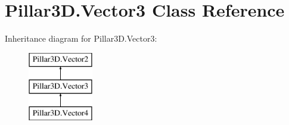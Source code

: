 \hypertarget{class_pillar3_d_1_1_vector3}{}\section{Pillar3\+D.\+Vector3 Class Reference}
\label{class_pillar3_d_1_1_vector3}
Inheritance diagram for Pillar3\+D.\+Vector3\+:\begin{figure}[H]
\begin{center}
\leavevmode
\includegraphics[height=3.000000cm]{class_pillar3_d_1_1_vector3}
\end{center}
\end{figure}
